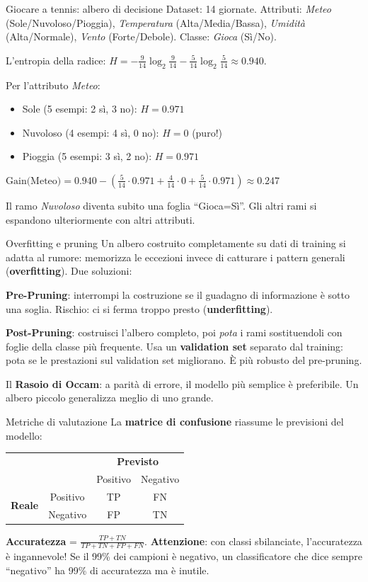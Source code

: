 \documentclass[12pt,a4paper]{article}
\begin{document}
\begin{esempio}{Giocare a tennis: albero di decisione}
Dataset: 14 giornate. Attributi: \textit{Meteo} (Sole/Nuvoloso/Pioggia), \textit{Temperatura} (Alta/Media/Bassa), \textit{Umidità} (Alta/Normale), \textit{Vento} (Forte/Debole). Classe: \textit{Gioca} (Sì/No).

L'entropia della radice: $H = -\frac{9}{14}\log_2\frac{9}{14} - \frac{5}{14}\log_2\frac{5}{14} \approx 0.940$.

Per l'attributo \textit{Meteo}:
\begin{itemize}[noitemsep]
  \item Sole (5 esempi: 2 sì, 3 no): $H = 0.971$
  \item Nuvoloso (4 esempi: 4 sì, 0 no): $H = 0$ (puro!)
  \item Pioggia (5 esempi: 3 sì, 2 no): $H = 0.971$
\end{itemize}
$\text{Gain(Meteo)} = 0.940 - (\frac{5}{14} \cdot 0.971 + \frac{4}{14} \cdot 0 + \frac{5}{14} \cdot 0.971) \approx 0.247$

Il ramo \textit{Nuvoloso} diventa subito una foglia ``Gioca=Sì''. Gli altri rami si espandono ulteriormente con altri attributi.
\end{esempio}

\begin{narrativo}{Overfitting e pruning}
Un albero costruito completamente su dati di training si adatta al rumore: memorizza le eccezioni invece di catturare i pattern generali (\textbf{overfitting}). Due soluzioni:

\textbf{Pre-Pruning}: interrompi la costruzione se il guadagno di informazione è sotto una soglia. Rischio: ci si ferma troppo presto (\textbf{underfitting}).

\textbf{Post-Pruning}: costruisci l'albero completo, poi \emph{pota} i rami sostituendoli con foglie della classe più frequente. Usa un \textbf{validation set} separato dal training: pota se le prestazioni sul validation set migliorano. È più robusto del pre-pruning.

Il \textbf{Rasoio di Occam}: a parità di errore, il modello più semplice è preferibile. Un albero piccolo generalizza meglio di uno grande.
\end{narrativo}

\begin{narrativo}{Metriche di valutazione}
La \textbf{matrice di confusione} riassume le previsioni del modello:
\begin{center}
\begin{tabular}{cc|cc}
& & \multicolumn{2}{c}{\textbf{Previsto}} \\
& & Positivo & Negativo \\
\hline
\multirow{2}{*}{\textbf{Reale}} & Positivo & TP & FN \\
& Negativo & FP & TN \\
\end{tabular}
\end{center}
\textbf{Accuratezza} = $\frac{TP+TN}{TP+TN+FP+FN}$. \textbf{Attenzione}: con classi sbilanciate, l'accuratezza è ingannevole! Se il 99\% dei campioni è negativo, un classificatore che dice sempre ``negativo'' ha 99\% di accuratezza ma è inutile.
\end{narrativo}
\end{document}
